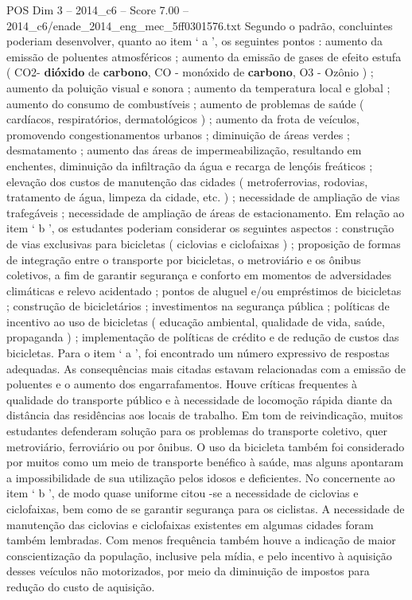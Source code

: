 \begin{textsample}{POS Dim 3 – 2014\_c6 – Score 7.00 – 2014\_c6/enade\_2014\_eng\_mec\_5ff0301576.txt}
Segundo o padrão, concluintes poderiam desenvolver, quanto ao item ‘ a ’, os seguintes pontos : aumento da emissão de poluentes atmosféricos ; aumento da emissão de gases de efeito estufa ( CO2- \textbf{dióxido} de \textbf{carbono}, CO - monóxido de \textbf{carbono}, O3 - Ozônio ) ; aumento da poluição visual e sonora ; aumento da temperatura local e global ; aumento do consumo de combustíveis ; aumento de problemas de saúde ( cardíacos, respiratórios, dermatológicos ) ; aumento da frota de veículos, promovendo congestionamentos urbanos ; diminuição de áreas verdes ; desmatamento ; aumento das áreas de impermeabilização, resultando em enchentes, diminuição da infiltração da água e recarga de lençóis freáticos ; elevação dos custos de manutenção das cidades ( metroferrovias, rodovias, tratamento de água, limpeza da cidade, etc. ) ; necessidade de ampliação de vias trafegáveis ; necessidade de ampliação de áreas de estacionamento.
Em relação ao item ‘ b ’, os estudantes poderiam considerar os seguintes aspectos : construção de vias exclusivas para bicicletas ( ciclovias e ciclofaixas ) ; proposição de formas de integração entre o transporte por bicicletas, o metroviário e os ônibus coletivos, a fim de garantir segurança e conforto em momentos de adversidades climáticas e relevo acidentado ; pontos de aluguel e/ou empréstimos de bicicletas ; construção de bicicletários ; investimentos na segurança pública ; políticas de incentivo ao uso de bicicletas ( educação ambiental, qualidade de vida, saúde, propaganda ) ; implementação de políticas de crédito e de redução de custos das bicicletas.
Para o item ‘ a ’, foi encontrado um número expressivo de respostas adequadas.
As consequências mais citadas estavam relacionadas com a emissão de poluentes e o aumento dos engarrafamentos.
Houve críticas frequentes à qualidade do transporte público e à necessidade de locomoção rápida diante da distância das residências aos locais de trabalho.
Em tom de reivindicação, muitos estudantes defenderam solução para os problemas do transporte coletivo, quer metroviário, ferroviário ou por ônibus.
O uso da bicicleta também foi considerado por muitos como um meio de transporte benéfico à saúde, mas alguns apontaram a impossibilidade de sua utilização pelos idosos e deficientes.
No concernente ao item ‘ b ’, de modo quase uniforme citou -se a necessidade de ciclovias e ciclofaixas, bem como de se garantir segurança para os ciclistas.
A necessidade de manutenção das ciclovias e ciclofaixas existentes em algumas cidades foram também lembradas.
Com menos frequência também houve a indicação de maior conscientização da população, inclusive pela mídia, e pelo incentivo à aquisição desses veículos não motorizados, por meio da diminuição de impostos para redução do custo de aquisição.

\end{textsample}
